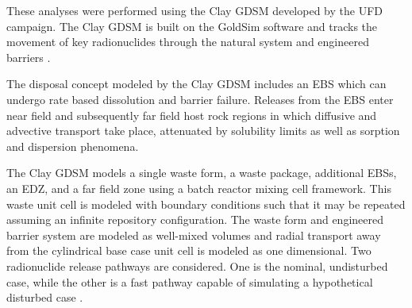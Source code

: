 
These analyses were performed using the Clay \gls{GDSM} developed by the 
\gls{UFD} campaign\cite{clayton_generic_2011}. The Clay \gls{GDSM} is built on 
the 
GoldSim software and tracks the movement of key radionuclides through the 
natural system and engineered barriers \cite{golder_goldsim_2010, 
golder_goldsim_ct_2010}.

The disposal concept modeled by the Clay \gls{GDSM} includes an \gls{EBS} which 
can undergo rate based dissolution and barrier failure. Releases from the 
\gls{EBS} enter 
near field and subsequently far field host rock regions in which diffusive and 
advective transport take place, attenuated by solubility limits as well as 
sorption and dispersion phenomena.  

The Clay \gls{GDSM} models a single waste form, a waste package, additional 
\glspl{EBS}, 
an \gls{EDZ}, and a far field zone using a batch reactor mixing cell framework. 
This waste unit cell is modeled 
with boundary conditions such that it may be repeated assuming an infinite 
repository configuration. The waste form and engineered barrier system are 
modeled as well-mixed volumes 
and radial transport away from the cylindrical base case unit cell is modeled as  
one dimensional. Two radionuclide release pathways are considered. One is the 
nominal, 
undisturbed case, while the other is a fast pathway capable of simulating a 
hypothetical disturbed case 
\cite{clayton_generic_2011}.
